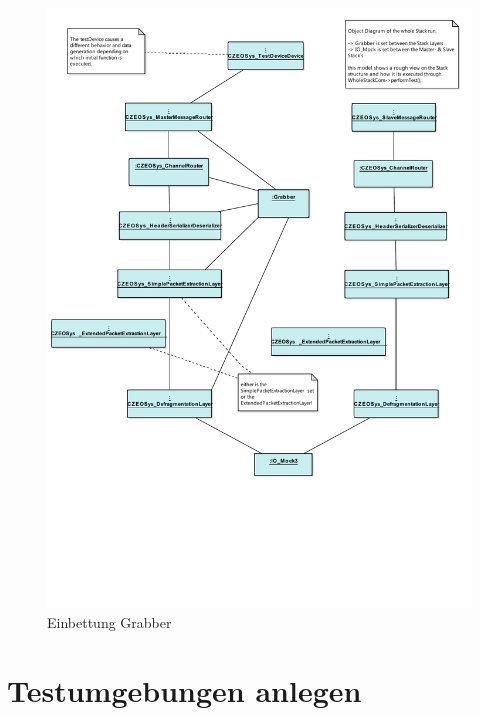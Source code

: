 \documentclass[12pt,a4paper]{scrreprt}
\begin{document}
\begin{figure}[htbp] 
  \centering
     \includegraphics[width=1.0\textwidth]{object_diagramm.pdf}
  \caption{Einbettung Grabber}
  \label{fig:Bild2}
\end{figure}

\newpage
\section{Testumgebungen anlegen}
\end{document}
